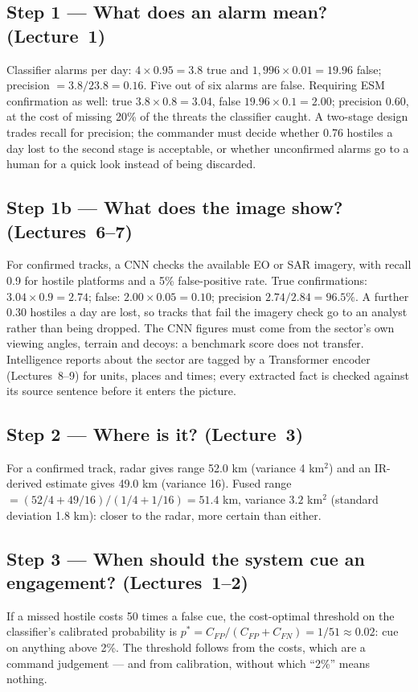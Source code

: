 \documentclass[11pt]{article}
\begin{document}
\subsection{Step 1 --- What does an alarm mean? (Lecture~1)}
Classifier alarms per day: $4\times0.95=3.8$ true and $1{,}996\times0.01=19.96$ false; precision $=3.8/23.8=0.16$. Five out of six alarms are false. Requiring ESM confirmation as well: true $3.8\times0.8=3.04$, false $19.96\times0.1=2.00$; precision $0.60$, at the cost of missing 20\% of the threats the classifier caught. A two-stage design trades recall for precision; the commander must decide whether 0.76 hostiles a day lost to the second stage is acceptable, or whether unconfirmed alarms go to a human for a quick look instead of being discarded.
\subsection{Step 1b --- What does the image show? (Lectures~6--7)}
For confirmed tracks, a CNN checks the available EO or SAR imagery, with recall 0.9 for hostile platforms and a 5\% false-positive rate. True confirmations: $3.04\times0.9=2.74$; false: $2.00\times0.05=0.10$; precision $2.74/2.84=96.5\%$. A further $0.30$ hostiles a day are lost, so tracks that fail the imagery check go to an analyst rather than being dropped. The CNN figures must come from the sector's own viewing angles, terrain and decoys: a benchmark score does not transfer. Intelligence reports about the sector are tagged by a Transformer encoder (Lectures~8--9) for units, places and times; every extracted fact is checked against its source sentence before it enters the picture.
\subsection{Step 2 --- Where is it? (Lecture~3)}
For a confirmed track, radar gives range 52.0 km (variance 4 km$^2$) and an IR-derived estimate gives 49.0 km (variance 16). Fused range $=(52/4+49/16)/(1/4+1/16)=51.4$ km, variance $3.2$ km$^2$ (standard deviation 1.8 km): closer to the radar, more certain than either.
\subsection{Step 3 --- When should the system cue an engagement? (Lectures~1--2)}
If a missed hostile costs 50 times a false cue, the cost-optimal threshold on the classifier's calibrated probability is $p^*=C_{FP}/(C_{FP}+C_{FN})=1/51\approx0.02$: cue on anything above 2\%. The threshold follows from the costs, which are a command judgement --- and from calibration, without which ``2\%'' means nothing.
\end{document}
